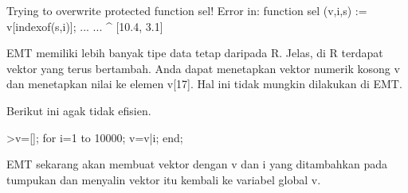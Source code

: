 \documentclass[a4paper,10pt]{article}
\begin{document}
\begin{eulernotebook}
\begin{eulercomment}
\begin{eulercomment}
\begin{eulercomment}
\begin{eulercomment}
\begin{eulercomment}
\begin{eulercomment}
\begin{eulercomment}
\begin{eulercomment}
\begin{eulercomment}
\begin{eulercomment}
\begin{eulercomment}
\begin{eulercomment}
\begin{eulercomment}
\begin{eulercomment}
\begin{eulercomment}
\begin{eulercomment}
\begin{eulercomment}
\begin{eulercomment}
\begin{eulercomment}
\begin{eulercomment}
\begin{eulercomment}
\begin{eulercomment}
\begin{eulercomment}
\begin{eulercomment}
\begin{eulercomment}
\begin{eulercomment}
\begin{eulercomment}
\begin{eulercomment}
\begin{eulercomment}
\begin{eulercomment}
\begin{eulercomment}
\begin{eulercomment}
\begin{eulercomment}
\begin{eulercomment}
\begin{euleroutput}
  Trying to overwrite protected function sel!
  Error in:
  function sel (v,i,s) := v[indexof(s,i)]; ... ...
               ^
  [10.4,  3.1]
\end{euleroutput}
\begin{eulercomment}
EMT memiliki lebih banyak tipe data tetap daripada R. Jelas, di R
terdapat vektor yang terus bertambah. Anda dapat menetapkan vektor
numerik kosong v dan menetapkan nilai ke elemen v[17]. Hal ini tidak
mungkin dilakukan di EMT.

Berikut ini agak tidak efisien.
\end{eulercomment}
\begin{eulerprompt}
>v=[]; for i=1 to 10000; v=v|i; end;
\end{eulerprompt}
\begin{eulercomment}
EMT sekarang akan membuat vektor dengan v dan i yang ditambahkan pada
tumpukan dan menyalin vektor itu kembali ke variabel global v.


\end{eulercomment}
\end{eulercomment}
\end{eulercomment}
\end{eulercomment}
\end{eulercomment}
\end{eulercomment}
\end{eulercomment}
\end{eulercomment}
\end{eulercomment}
\end{eulercomment}
\end{eulercomment}
\end{eulercomment}
\end{eulercomment}
\end{eulercomment}
\end{eulercomment}
\end{eulercomment}
\end{eulercomment}
\end{eulercomment}
\end{eulercomment}
\end{eulercomment}
\end{eulercomment}
\end{eulercomment}
\end{eulercomment}
\end{eulercomment}
\end{eulercomment}
\end{eulercomment}
\end{eulercomment}
\end{eulercomment}
\end{eulercomment}
\end{eulercomment}
\end{eulercomment}
\end{eulercomment}
\end{eulercomment}
\end{eulercomment}
\end{eulercomment}
\end{eulernotebook}
\end{document}

